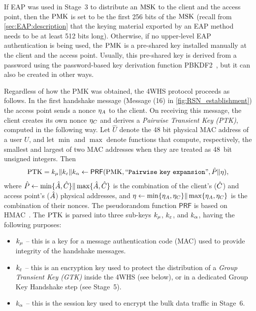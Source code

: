 If EAP was used in Stage~3 to distribute an $\mathrm{MSK}$ to the client and the access point,
then the $\mathrm{PMK}$ is set to be the first 256 bits of the $\mathrm{MSK}$
(recall from \cref{sec:EAP:description} that the keying material exported by an EAP method needs to be at least 512 bits long).
Otherwise,
if no upper-level EAP authentication is being used,
the $\mathrm{PMK}$ is a pre-shared key installed manually at the client and the access point.
Usually,
this pre-shared key is derived from a password using the password-based key derivation function PBKDF2~\cite{IETF:RFC8018:PBKDF2},
but it can also be created in other ways.


Regardless of how the PMK was obtained,
the 4WHS protocol proceeds as follows.
In the first handshake message  
(Message (16) in \cref{fig:RSN_establishment})
the access point sends a nonce $\eta_A$ to the client.
On receiving this message,
the client creates its own nonce $\eta_C$ and derives a \emph{Pairwise Transient Key (PTK)},
computed in the following way.
Let $\hat{U}$ denote the 48 bit physical MAC address of a user $U$,
and let $\min$ and $\max$ denote functions that compute,
respectively,
the smallest and largest of two MAC addresses when they are treated as  48~bit unsigned integers. 
Then
\begin{gather}\label{eq:ptk_derivation_function}
	\mathrm{PTK} = k_\mu \| k_\varepsilon \| k_{\alpha} 
		\gets \operatorname{\mathsf{PRF}}(\mathrm{PMK}, ``\mathtt{Pairwise\ key\ expansion}", \hat{P} \| \eta ), 
\end{gather}
where $	\hat{P} \gets \min \lbrace \hat{A}, \hat{C} \rbrace \| \max \lbrace \hat{A}, \hat{C} \rbrace	$
is the combination of the client's ($\hat{C}$) and access point's ($\hat{A}$) physical addresses,
and $\eta \gets \min \lbrace \eta_A, \eta_C \rbrace \| \max \lbrace \eta_A, \eta_C \rbrace$
is the combination of their nonces.
The pseudorandom function $\mathsf{PRF}$ is based on HMAC~\cite{IETF:RFC2104:HMAC}.
The $\mathrm{PTK}$ is parsed into three sub-keys $k_\mu$, $k_\varepsilon$, and $k_{\alpha}$,
having the following purposes:
\begin{itemize}
	\item $k_\mu$ -- this is a key for a message authentication code (MAC) used to provide integrity of the handshake messages.
	
	\item $k_\varepsilon$ -- this is an encryption key used to protect the distribution of a \emph{Group Transient Key (GTK)}
	inside the 4WHS (see below),
	or in a dedicated Group Key Handshake step (see Stage~5). 
	
	\item $k_\alpha$ -- this is the session key used to encrypt the bulk data traffic in Stage~6.
\end{itemize}
 
